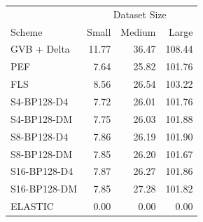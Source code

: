 \begin{tabular}{lrrr}
\toprule
 & \multicolumn{3}{c}{Dataset Size} \\
Scheme & Small & Medium & Large \\
\midrule
GVB + Delta & 11.77 & 36.47 & 108.44 \\
PEF & 7.64 & 25.82 & 101.76 \\
FLS & 8.56 & 26.54 & 103.22 \\
S4-BP128-D4 & 7.72 & 26.01 & 101.76 \\
S4-BP128-DM & 7.75 & 26.03 & 101.88 \\
S8-BP128-D4 & 7.86 & 26.19 & 101.90 \\
S8-BP128-DM & 7.85 & 26.20 & 101.67 \\
S16-BP128-D4 & 7.87 & 26.27 & 101.86 \\
S16-BP128-DM & 7.85 & 27.28 & 101.82 \\
ELASTIC & 0.00 & 0.00 & 0.00 \\
\bottomrule
\end{tabular}
